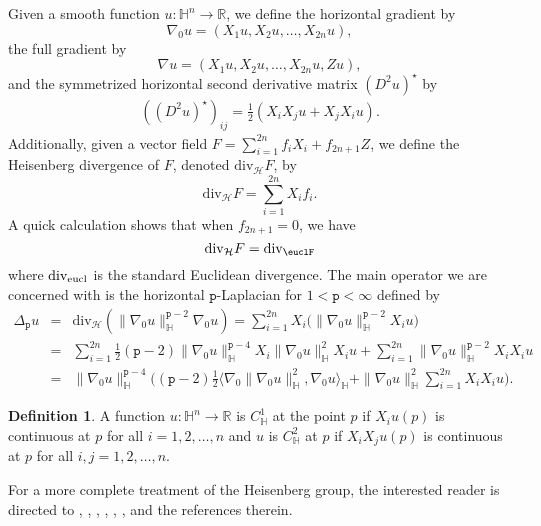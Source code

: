 \documentclass[12pt]{amsart}
\theoremstyle{plain}
\theoremstyle{definition}
\newtheorem{definition}{Definition}
\numberwithin{equation}{section}
\begin{document}
Given a smooth function $u:\mathbb{H}^n \to \mathbb{R}$, we define the horizontal gradient by
$$\nabla_0 u = (X_1u,X_2u,\ldots, X_{2n}u),$$ 
the full gradient by $$\nabla u = (X_1u,X_2u,\ldots, X_{2n}u,Zu),$$
and the symmetrized horizontal second
derivative matrix $(D^2u)^{\star}$  by 
\begin{eqnarray*} 
((D^2u)^{\star})_{ij}=\frac{1}{2}(X_iX_ju + X_jX_iu).
\end{eqnarray*}
Additionally, given a vector field $F=\sum_{i=1}^{2n}f_iX_i+f_{2n+1}Z$, we define the Heisenberg divergence of $F$, denoted ${\operatorname{div_{\mathcal{H}}}} F$, 
by $${\operatorname{div_{\mathcal{H}}}} F = \sum_{i=1}^{2n}X_if_i.$$ A quick calculation shows that when $f_{2n+1}=0$, we have $${\operatorname{div_{\mathcal{H}}}} F = \textmd{div}_\euclF$$ where 
$\textmd{div}_{\operatorname{eucl}}$ is the standard Euclidean divergence. 
The main operator we are concerned with is the 
horizontal ${\texttt{p}}$-Laplacian for
$1< {\texttt{p}} <\infty$ defined by \begin{eqnarray}
\Delta_{\texttt{p}} u & = & {\operatorname{div_{\mathcal{H}}}}(\|\nabla_{0} u\|_{\mathbb{H}}^{{\texttt{p}}-2}\nabla_{0}u)  =  \sum_{i=1}^{2n}X_i\big(\|\nabla_{0} u\|_{\mathbb{H}}^{{\texttt{p}}-2}X_iu\big) \nonumber\\
& = & \sum_{i=1}^{2n}\frac{1}{2}({\texttt{p}}-2)\|\nabla_{0} u\|_{\mathbb{H}}^{{\texttt{p}}-4}X_i\|\nabla_{0} u\|_{\mathbb{H}}^{2}X_iu+ \sum_{i=1}^{2n}\|\nabla_{0} u\|_{\mathbb{H}}^{{\texttt{p}}-2}X_iX_iu   \label{reductionh}\\
& = &\|\nabla_{0} u\|_{\mathbb{H}}^{{\texttt{p}}-4}\bigg(({\texttt{p}}-2)\frac{1}{2}
{\langle {\nabla_{0}\|\nabla_{0} u\|_{\mathbb{H}}^{2}},{\nabla_{0} u} \rangle_\mathbb{H}}
 +\|\nabla_{0} u\|_{\mathbb{H}}^{2}\sum_{i=1}^{2n}X_iX_iu\bigg).   \nonumber 
\end{eqnarray}
\begin{definition}
 A function $u: \mathbb{H}^n \to \mathbb{R}$ is $C^1_{\mathbb{H}}$ at the point $p$ if $X_iu(p)$ is continuous at $p$ for all $i=1, 2,\ldots, n$ and $u$ is $C^2_{\mathbb{H}}$ at $p$ if $X_iX_ju(p)$ is continuous at $p$ for all $i,j=1,2,\ldots, n$.
\end{definition}
 
For a more complete treatment of the Heisenberg group, the interested
reader is directed to \cite{BR:SRG}, \cite{B:HG}, \cite{F:SE}, \cite{FS:HSHG}
\cite{G:MS}, \cite{H:CCG}, \cite{K:LGHT}, \cite{St:HA} and the references therein.
\end{document}
